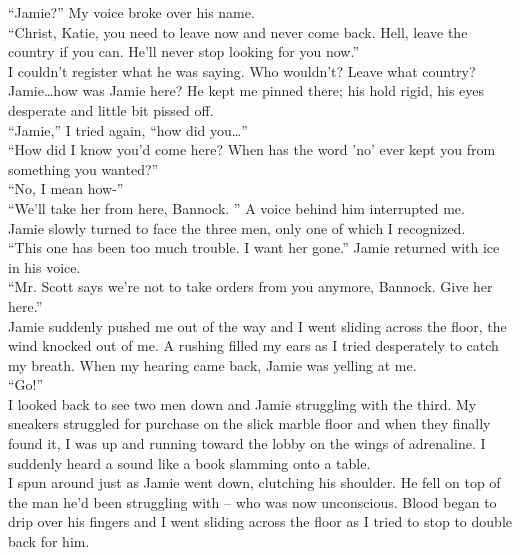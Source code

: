 \documentclass[a5paper]{scrartcl}
\begin{document}
\enquote{Jamie?} My voice broke over his name.\\


\enquote{Christ, Katie, you need to leave now and never come back. Hell, leave the country if you can. He'll never stop looking for you now.}\\


I couldn't register what he was saying. Who wouldn't? Leave what country? Jamie\dots how was Jamie here? He kept me pinned there; his hold rigid, his eyes desperate and little bit pissed off.\\


\enquote{Jamie,} I tried again, \enquote{how did you\dots }\\


\enquote{How did I know you'd come here? When has the word 'no' ever kept you from something you wanted?}\\


\enquote{No, I mean how-}\\


\enquote{We'll take her from here, Bannock. } A voice behind him interrupted me. \\


Jamie slowly turned to face the three men, only one of which I recognized.\\


\enquote{This one has been too much trouble. I want her gone.} Jamie returned with ice in his voice.\\


\enquote{Mr. Scott says we're not to take orders from you anymore, Bannock. Give her here.}\\


Jamie suddenly pushed me out of the way and I went sliding across the floor, the wind knocked out of me.  A rushing filled my ears as I tried desperately to catch my breath. When my hearing came back, Jamie was yelling at me.\\


\enquote{Go!}\\


I looked back to see two men down and Jamie struggling with the third. My sneakers struggled for purchase on the slick marble floor and when they finally found it, I was up and running toward the lobby on the wings of adrenaline. I suddenly heard a sound like a book slamming onto a table. \\


I spun around just as Jamie went down, clutching his shoulder. He fell on top of the man he'd been struggling with -- who was now unconscious.   Blood began to drip over his fingers and I went sliding across the floor as I tried to stop to double back for him. \\
\end{document}
